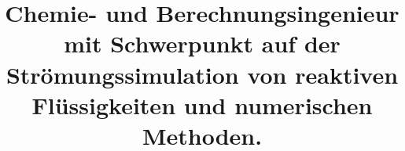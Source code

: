 \usepackage[scale=0.8]{geometry}
\setlength{\hintscolumnwidth}{2.4cm}                %
\usepackage{multicol}
\usepackage{hyphenat}

\newcommand\myitem{\item[\textbullet]\hspace*{.5em} }
\renewcommand*{\namefont}{\fontsize{34}{40}\mdseries\upshape}
\title{\nohyphens{Chemie- und Berechnungsingenieur mit Schwerpunkt auf der Strömungssimulation von reaktiven Flüssigkeiten und numerischen Methoden.} }



\vspace{-5mm}
\makecvtitle

